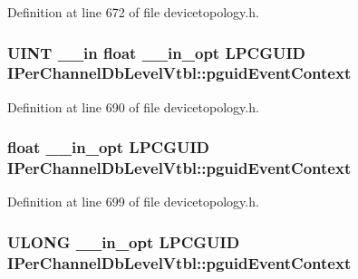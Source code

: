 Definition at line 672 of file devicetopology.\+h.

\subsubsection[{\texorpdfstring{pguid\+Event\+Context}{pguidEventContext}}]{ {\bf U\+I\+NT} {\bf \+\_\+\+\_\+in} float {\bf \+\_\+\+\_\+in\+\_\+opt} {\bf L\+P\+C\+G\+U\+ID} I\+Per\+Channel\+Db\+Level\+Vtbl\+::pguid\+Event\+Context}\hypertarget{struct_i_per_channel_db_level_vtbl_af25af43000a3c05672e7798acf124bd9}{}\label{struct_i_per_channel_db_level_vtbl_af25af43000a3c05672e7798acf124bd9}


Definition at line 690 of file devicetopology.\+h.

\subsubsection[{\texorpdfstring{pguid\+Event\+Context}{pguidEventContext}}]{ float {\bf \+\_\+\+\_\+in\+\_\+opt} {\bf L\+P\+C\+G\+U\+ID} I\+Per\+Channel\+Db\+Level\+Vtbl\+::pguid\+Event\+Context}\hypertarget{struct_i_per_channel_db_level_vtbl_a95bed2b6a9834aae9b52293b316f96b5}{}\label{struct_i_per_channel_db_level_vtbl_a95bed2b6a9834aae9b52293b316f96b5}


Definition at line 699 of file devicetopology.\+h.

\subsubsection[{\texorpdfstring{pguid\+Event\+Context}{pguidEventContext}}]{ {\bf U\+L\+O\+NG} {\bf \+\_\+\+\_\+in\+\_\+opt} {\bf L\+P\+C\+G\+U\+ID} I\+Per\+Channel\+Db\+Level\+Vtbl\+::pguid\+Event\+Context}\hypertarget{struct_i_per_channel_db_level_vtbl_a71cfe76a5f22face38b07f38699ac57a}{}\label{struct_i_per_channel_db_level_vtbl_a71cfe76a5f22face38b07f38699ac57a}


